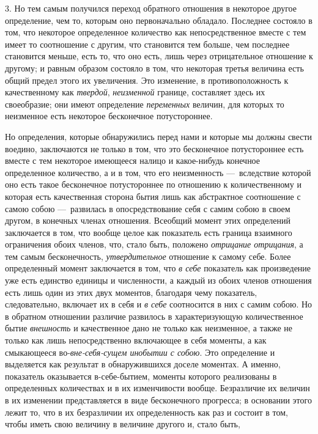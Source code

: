 3. Но тем самым получился переход обратного отношения в некоторое другое
определение, чем то, которым оно первоначально обладало. Последнее состояло
в том, что некоторое определенное количество как непосредственное вместе с
тем имеет то соотношение с другим, что становится тем больше, чем последнее
становится меньше, есть то, что оно есть, лишь через отрицательное
отношение к другому; и равным образом состояло в том, что некоторая третья
величина есть общий предел этого их увеличения. Это изменение, в
противоположность к качественному как {\em твердой},
{\em неизменной} границе, составляет здесь их
своеобразие; они имеют определение {\em переменных}
величин, для которых то неизменное есть некоторое бесконечное
потустороннее.

Но определения, которые обнаружились перед нами и которые мы должны свести
воедино, заключаются не только в том, что это бесконечное потустороннее
есть вместе с тем некоторое имеющееся налицо и какое-нибудь конечное
определенное количество, а и в том, что его неизменность —~вследствие
которой оно есть такое бесконечное потустороннее по отношению к
количественному и которая есть качественная сторона бытия лишь как
абстрактное соотношение с самою собою —~развилась в опосредствование себя с
самим собою в своем другом, в конечных членах отношения. Всеобщий момент
этих определений заключается в том, что вообще целое как показатель есть
граница взаимного ограничения обоих членов, что, стало быть, положено
{\em отрицание отрицания}, а тем самым бесконечность,
{\em утвердительное} отношение к самому себе. Более
определенный момент заключается в том, что {\em в себе}
показатель как произведение уже есть единство единицы и численности, а
каждый из обоих членов отношения есть лишь один из этих двух моментов,
благодаря чему показатель, следовательно, включает их в себя и
{\em в себе} соотносится в них с самим собою. Но в
обратном отношении различие развилось в характеризующую количественное
бытие {\em внешность} и качественное дано не только как
неизменное, а также не только как лишь непосредственно включающее в себя
моменты, а как смыкающееся во-{\em вне-себя-сущем
инобытии с собою}. Это определение и выделяется как результат в
обнаружившихся доселе моментах. А именно, показатель оказывается
в-себе-бытием, моменты которого реализованы в определенных количествах и в
их изменчивости вообще. Безразличие их величин в их изменении
представляется в виде бесконечного прогресса; в основании этого лежит то,
что в их безразличии их определенность как раз и состоит в том, чтобы иметь
свою величину в величине другого и, стало быть,

